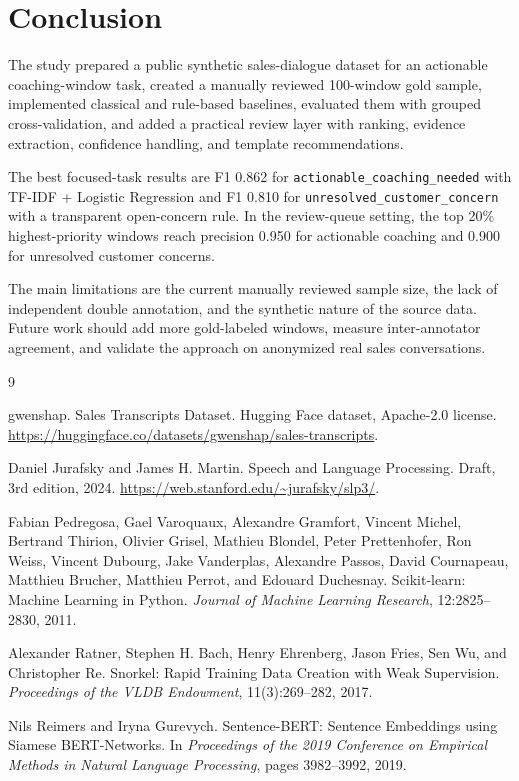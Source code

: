 \documentclass{article}
\begin{document}
\section{Conclusion}
The study prepared a public synthetic sales-dialogue dataset for an actionable coaching-window task, created a manually reviewed 100-window gold sample, implemented classical and rule-based baselines, evaluated them with grouped cross-validation, and added a practical review layer with ranking, evidence extraction, confidence handling, and template recommendations.

The best focused-task results are F1 0.862 for \texttt{actionable\_coaching\_needed} with TF-IDF + Logistic Regression and F1 0.810 for \texttt{unresolved\_customer\_concern} with a transparent open-concern rule. In the review-queue setting, the top 20\% highest-priority windows reach precision 0.950 for actionable coaching and 0.900 for unresolved customer concerns.

The main limitations are the current manually reviewed sample size, the lack of independent double annotation, and the synthetic nature of the source data. Future work should add more gold-labeled windows, measure inter-annotator agreement, and validate the approach on anonymized real sales conversations.

\begin{thebibliography}{9}

gwenshap.
\newblock Sales Transcripts Dataset.
\newblock Hugging Face dataset, Apache-2.0 license.
\newblock \url{https://huggingface.co/datasets/gwenshap/sales-transcripts}.

Daniel Jurafsky and James H. Martin.
\newblock Speech and Language Processing.
\newblock Draft, 3rd edition, 2024.
\newblock \url{https://web.stanford.edu/~jurafsky/slp3/}.

Fabian Pedregosa, Gael Varoquaux, Alexandre Gramfort, Vincent Michel, Bertrand Thirion, Olivier Grisel, Mathieu Blondel, Peter Prettenhofer, Ron Weiss, Vincent Dubourg, Jake Vanderplas, Alexandre Passos, David Cournapeau, Matthieu Brucher, Matthieu Perrot, and Edouard Duchesnay.
\newblock Scikit-learn: Machine Learning in Python.
\newblock \emph{Journal of Machine Learning Research}, 12:2825--2830, 2011.

Alexander Ratner, Stephen H. Bach, Henry Ehrenberg, Jason Fries, Sen Wu, and Christopher Re.
\newblock Snorkel: Rapid Training Data Creation with Weak Supervision.
\newblock \emph{Proceedings of the VLDB Endowment}, 11(3):269--282, 2017.

Nils Reimers and Iryna Gurevych.
\newblock Sentence-BERT: Sentence Embeddings using Siamese BERT-Networks.
\newblock In \emph{Proceedings of the 2019 Conference on Empirical Methods in Natural Language Processing}, pages 3982--3992, 2019.

\end{thebibliography}
\end{document}
